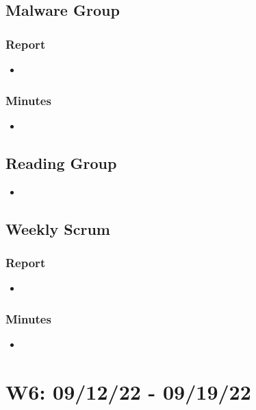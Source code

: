 \documentclass{article}
\begin{document}
\subsection*{Malware Group}
\subsubsection*{Report}
\begin{itemize}
	\item 
\end{itemize}
\subsubsection*{Minutes}
\begin{itemize}
	\item 
\end{itemize}

\subsection*{Reading Group}
\begin{itemize}
	\item 
\end{itemize}

\subsection*{Weekly Scrum}
\subsubsection*{Report}
\begin{itemize}
	\item 
\end{itemize}
\subsubsection*{Minutes}
\begin{itemize}
	\item 
\end{itemize}

\pagebreak


\section*{W6: 09/12/22 - 09/19/22}
\end{document}
